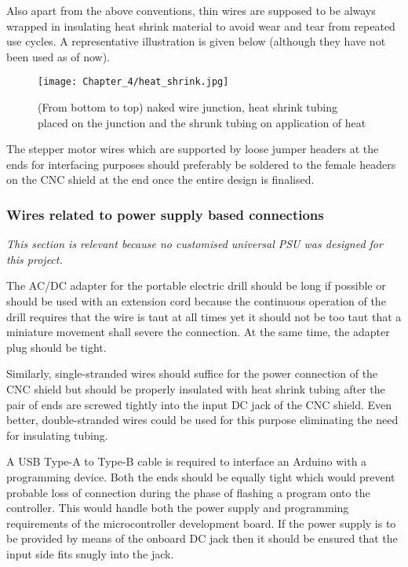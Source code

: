 Also apart from the above conventions, thin wires are supposed to be always wrapped in insulating heat shrink material to avoid wear and tear from repeated use cycles. A representative illustration is given below (although they have not been used as of now). \par

\begin{figure}[h]
 \centering
 \texttt{[image: Chapter\_4/heat\_shrink.jpg]}
 \caption{(From bottom to top) naked wire junction, heat shrink tubing placed on the junction and the shrunk tubing on application of heat}
 \label{fig:shrink}
\end{figure}

The stepper motor wires which are supported by loose jumper headers at the ends for interfacing purposes should preferably be soldered to the female headers on the CNC shield at the end once the entire design is finalised.

\subsubsection*{Wires related to power supply based connections}

\textit{This section is relevant because no customised universal PSU was designed for this project.}

The AC/DC adapter for the portable electric drill should be long if possible or should be used with an extension cord because the continuous operation of the drill requires that the wire is taut at all times yet it should not be too taut that a miniature movement shall severe the connection. At the same time, the adapter plug should be tight. \par

Similarly, single-stranded wires should suffice for the power connection of the CNC shield but should be properly insulated with heat shrink tubing after the pair of ends are screwed tightly into the input DC jack of the CNC shield. Even better, double-stranded wires could be used for this purpose eliminating the need for insulating tubing. \par

A USB Type-A to Type-B cable is required to interface an Arduino with a programming device. Both the ends should be equally tight which would prevent probable loss of connection during the phase of flashing a program onto the controller. This would handle both the power supply and programming requirements of the microcontroller development board. If the power supply is to be provided by means of the onboard DC jack then it should be ensured that the input side fits snugly into the jack.
